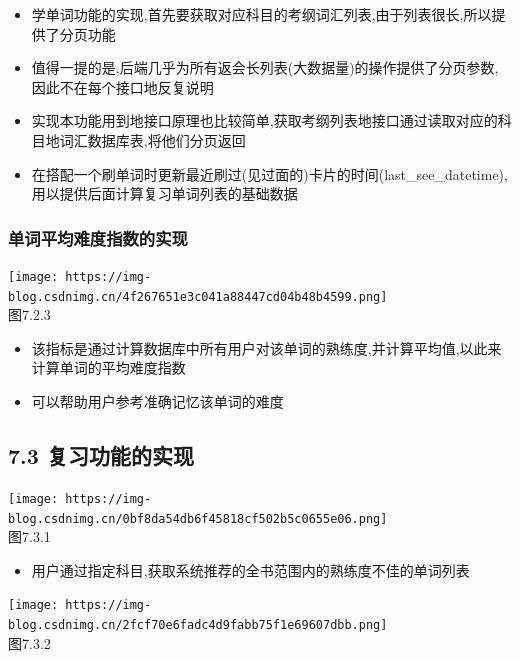 \documentclass[
]{article}
\begin{document}
\begin{itemize}
\item
  学单词功能的实现,首先要获取对应科目的考纲词汇列表,由于列表很长,所以提供了分页功能
\item
  值得一提的是,后端几乎为所有返会长列表(大数据量)的操作提供了分页参数,因此不在每个接口地反复说明
\item
  实现本功能用到地接口原理也比较简单,获取考纲列表地接口通过读取对应的科目地词汇数据库表,将他们分页返回
\item
  在搭配一个刷单词时更新最近刷过(见过面的)卡片的时间(last\_see\_datetime),用以提供后面计算复习单词列表的基础数据
\end{itemize}

\hypertarget{ux5355ux8bcdux5e73ux5747ux96beux5ea6ux6307ux6570ux7684ux5b9eux73b0}{%
\subsubsection{单词平均难度指数的实现}\label{ux5355ux8bcdux5e73ux5747ux96beux5ea6ux6307ux6570ux7684ux5b9eux73b0}}

\texttt{[image: https://img-blog.csdnimg.cn/4f267651e3c041a88447cd04b48b4599.png]}\\
图7.2.3

\begin{itemize}
\item
  该指标是通过计算数据库中所有用户对该单词的熟练度,并计算平均值,以此来计算单词的平均难度指数
\item
  可以帮助用户参考准确记忆该单词的难度
\end{itemize}

\hypertarget{73-ux590dux4e60ux529fux80fdux7684ux5b9eux73b0}{%
\subsection{7.3
复习功能的实现}\label{73-ux590dux4e60ux529fux80fdux7684ux5b9eux73b0}}

\texttt{[image: https://img-blog.csdnimg.cn/0bf8da54db6f45818cf502b5c0655e06.png]}\\
图7.3.1

\begin{itemize}
\item
  用户通过指定科目,获取系统推荐的全书范围内的熟练度不佳的单词列表
\end{itemize}

\texttt{[image: https://img-blog.csdnimg.cn/2fcf70e6fadc4d9fabb75f1e69607dbb.png]}\\
图7.3.2
\end{document}
